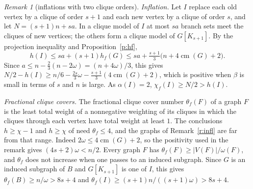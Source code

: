 \documentclass[11pt]{article}
\theoremstyle{definition}\newtheorem{conjecture}[theorem]{Conjecture}
\theoremstyle{remark}\newtheorem{remark}[theorem]{Remark}
\newcommand{\cm}{\operatorname{cm}}
\begin{document}
\begin{remark}[inflations with two clique orders]
\emph{Inflation.} Let $I$ replace each old vertex by a clique of order $s+1$ and each new vertex by a clique of order $s$, and
let $N=(s+1)n+sa$. In a clique model of $I$ at most $sa$ branch sets meet the cliques of new vertices; the others form a clique
model of $G[K_{s+1}]$. By the projection inequality and Proposition~\ref{p:hf},
\[
 h(I)\le sa+(s+1)h_f(G)\le sa+\tfrac{s+1}3\bigl(n+4\cm(G)+2\bigr).
\]
Since $a\le n-\tfrac23(n-2\omega)=(n+4\omega)/3$, this gives
$N/2-h(I)\ge n/6-\tfrac{2s}3\omega-\tfrac{s+1}3(4\cm(G)+2)$, which is positive when $\beta$ is small in terms of $s$ and $n$
is large. As $\alpha(I)=2$, $\chi_f(I)\ge N/2>h(I)$.
\end{remark}

\noindent\emph{Fractional clique covers.} The fractional clique cover number $\theta_f(F)$ of a graph $F$ is the least total
weight of a nonnegative weighting of its cliques in which the cliques through each vertex have total weight at least $1$.
The conclusions $h\ge\chi-1$ and $h\ge\chi$ of \cite{MD} need $\theta_f\le4$, and the graphs of Remark~\ref{r:infl} are far
from that range. Indeed $2\omega\le4\cm(G)+2$, so the positivity used in the remark gives $(4s+2)\omega<n/2$. Every graph
$F$ has $\theta_f(F)\ge|V(F)|/\omega(F)$, and $\theta_f$ does not increase when one passes to an induced subgraph. Since
$G$ is an induced subgraph of $B$ and $G[K_{s+1}]$ is one of $I$, this gives $\theta_f(B)\ge n/\omega>8s+4$ and
$\theta_f(I)\ge(s+1)n/((s+1)\omega)>8s+4$.
\end{document}
